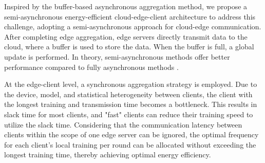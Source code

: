 \documentclass[journal]{IEEEtran}
\begin{document}
Inspired by the buffer-based asynchronous aggregation method\cite{nguyen_federated_2022}, we propose a semi-asynchronous energy-efficient cloud-edge-client architecture to address this challenge, adopting a semi-asynchronous approach for cloud-edge communication. After completing edge aggregation, edge servers directly transmit data to the cloud, where a buffer is used to store the data. When the buffer is full, a global update is performed. In theory, semi-asynchronous methods offer better performance compared to fully asynchronous methods \cite{nguyen_federated_2022}.

At the edge-client level, a synchronous aggregation strategy is employed. Due to the device, model, and statistical heterogeneity between clients, the client with the longest training and transmission time becomes a bottleneck. This results in slack time for most clients, and "fast" clients can reduce their training speed to utilize the slack time. Considering that the communication latency between clients within the scope of one edge server can be ignored, the optimal frequency for each client's local training per round can be allocated without exceeding the longest training time, thereby achieving optimal energy efficiency. 
\end{document}
